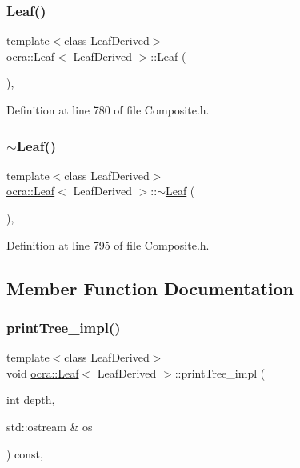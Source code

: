 \subsubsection{\texorpdfstring{Leaf()}{Leaf()}}
{\footnotesize\ttfamily template$<$class Leaf\+Derived$>$ \\
\hyperlink{classocra_1_1Leaf}{ocra\+::\+Leaf}$<$ Leaf\+Derived $>$\+::\hyperlink{classocra_1_1Leaf}{Leaf} (\begin{DoxyParamCaption}{ }\end{DoxyParamCaption})\hspace{0.3cm}{\ttfamily [inline]}, {\ttfamily [protected]}}



Definition at line 780 of file Composite.\+h.

\hypertarget{classocra_1_1Leaf_a192f19a657e776a381da384279417f01}{}\label{classocra_1_1Leaf_a192f19a657e776a381da384279417f01} 
\subsubsection{\texorpdfstring{$\sim$\+Leaf()}{~Leaf()}}
{\footnotesize\ttfamily template$<$class Leaf\+Derived$>$ \\
\hyperlink{classocra_1_1Leaf}{ocra\+::\+Leaf}$<$ Leaf\+Derived $>$\+::$\sim$\hyperlink{classocra_1_1Leaf}{Leaf} (\begin{DoxyParamCaption}{ }\end{DoxyParamCaption})\hspace{0.3cm}{\ttfamily [inline]}, {\ttfamily [protected]}}



Definition at line 795 of file Composite.\+h.



\subsection{Member Function Documentation}
\hypertarget{classocra_1_1Leaf_aaf46f5b8cd9d9667b8080898b1d9138a}{}\label{classocra_1_1Leaf_aaf46f5b8cd9d9667b8080898b1d9138a} 
\subsubsection{\texorpdfstring{print\+Tree\+\_\+impl()}{printTree\_impl()}}
{\footnotesize\ttfamily template$<$class Leaf\+Derived$>$ \\
void \hyperlink{classocra_1_1Leaf}{ocra\+::\+Leaf}$<$ Leaf\+Derived $>$\+::print\+Tree\+\_\+impl (\begin{DoxyParamCaption}\item[{int}]{depth,  }\item[{std\+::ostream \&}]{os }\end{DoxyParamCaption}) const\hspace{0.3cm}{\ttfamily [inline]}, {\ttfamily [protected]}}



